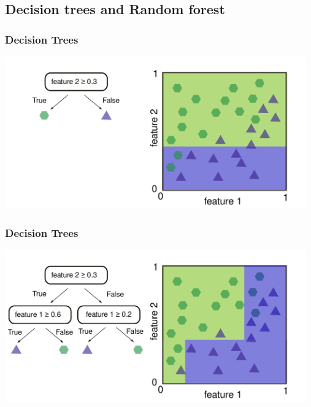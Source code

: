 \documentclass[aspectratio=169]{beamer}
\begin{document}



\subsection{Decision trees and Random forest}

\begin{frame}
  \frametitle{Decision Trees}
  \begin{center}
    \includegraphics[width=13.0cm]{images/decision_tree_1.pdf}
  \end{center}  
\end{frame}

\begin{frame}
  \frametitle{Decision Trees}
  \begin{center}
    \includegraphics[width=13.0cm]{images/decision_tree_2.pdf}
  \end{center}  
\end{frame}
\end{document}
